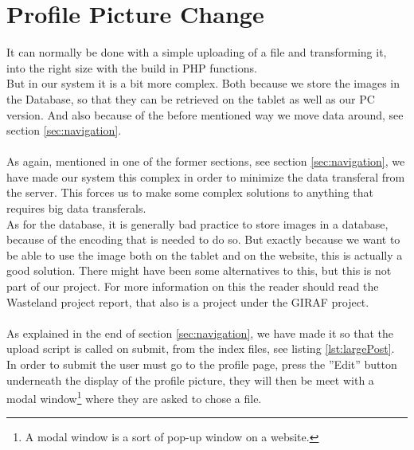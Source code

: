 \section{Profile Picture Change}
\label{sec:profilePicChange}
It can normally be done with a simple uploading of a file and transforming it, into the right size with the build in PHP functions.\\
But in our system it is a bit more complex. Both because we store the images in the Database, so that they can be retrieved on the tablet as well as our PC version. And also because of the before mentioned way we move data around, see section \ref{sec:navigation}.\\
\\
As again, mentioned in one of the former sections, see section \ref{sec:navigation}, we have made our system this complex in order to minimize the data transferal from the server. This forces us to make some complex solutions to anything that requires big data transferals.\\
As for the database, it is generally bad practice to store images in a database, because of the encoding that is needed to do so. But exactly because we want to be able to use the image both on the tablet and on the website, this is actually a good solution. There might have been some alternatives to this, but this is not part of our project. For more information on this the reader should read the Wasteland project report, that also is a project under the GIRAF project.\\
\\	
As explained in the end of section \ref{sec:navigation}, we have made it so that the upload script is called on submit, from the index files, see listing \ref{lst:largePost}.\\
In order to submit the user must go to the profile page, press the ''Edit'' button underneath the display of the profile picture, they will then be meet with a modal window\footnote{A modal window is a sort of pop-up window on a website.} where they are asked to chose a file.

